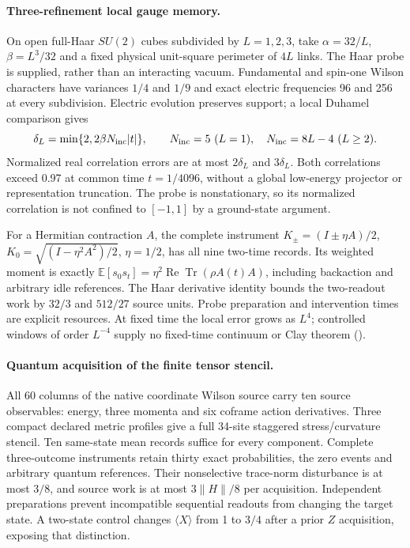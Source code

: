 \paragraph{Three-refinement local gauge memory.}
On open full-Haar $SU(2)$ cubes subdivided by $L=1,2,3$, take
$\alpha=32/L$, $\beta=L^3/32$ and a fixed physical unit-square perimeter
of $4L$ links. The Haar probe is supplied, rather than an interacting
vacuum. Fundamental and spin-one Wilson characters have variances $1/4$
and $1/9$ and exact electric frequencies 96 and 256 at every subdivision.
Electric evolution preserves support; a local Duhamel comparison gives
\[
 \delta_L=\min\{2,2\beta N_{\rm inc}|t|\},\qquad
 N_{\rm inc}=5\ (L=1),\quad N_{\rm inc}=8L-4\ (L\ge2).
\]
Normalized real correlation errors are at most $2\delta_L$ and
$3\delta_L$. Both correlations exceed 0.97 at common time $t=1/4096$,
without a global low-energy projector or representation truncation.
The probe is nonstationary, so its normalized correlation is not confined
to $[-1,1]$ by a ground-state argument.

For a Hermitian contraction $A$, the complete instrument
$K_\pm=(I\pm\eta A)/2$, $K_0=\sqrt{(I-\eta^2A^2)/2}$, $\eta=1/2$,
has all nine two-time records. Its weighted moment is exactly
$\mathbb E[s_0s_t]=\eta^2\operatorname{Re}\operatorname{Tr}(\rho A(t)A)$,
including backaction and arbitrary idle references. The Haar derivative
identity bounds the two-readout work by $32/3$ and $512/27$ source units.
Probe preparation and intervention times are explicit resources.
At fixed time the local error grows as $L^4$; controlled windows of
order $L^{-4}$ supply no fixed-time continuum or Clay theorem
().

\paragraph{Quantum acquisition of the finite tensor stencil.}
All 60 columns of the native coordinate Wilson source carry ten source
observables: energy, three momenta and six coframe action derivatives.
Three compact declared metric profiles give a full 34-site staggered
stress/curvature stencil. Ten same-state mean records suffice for every
component. Complete three-outcome instruments retain thirty exact
probabilities, the zero events and arbitrary quantum references.
Their nonselective trace-norm disturbance is at most $3/8$, and source
work is at most $3\|H\|/8$ per acquisition. Independent preparations
prevent incompatible sequential readouts from changing the target state.
A two-state control changes $\langle X\rangle$ from 1 to $3/4$ after a
prior $Z$ acquisition, exposing that distinction.

